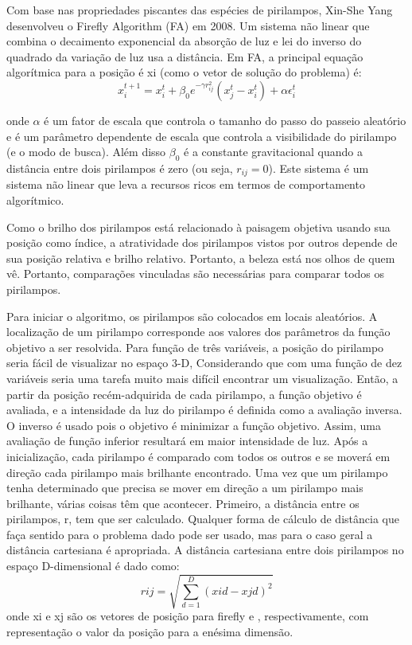 \documentclass[10pt]{article}
\begin{document}
Com base nas propriedades piscantes das espécies de 
pirilampos, Xin-She Yang desenvolveu o 
Firefly Algorithm (FA) em 2008. Um sistema não linear que 
combina o decaimento exponencial da absorção de luz e lei do 
inverso do quadrado da variação de luz usa a distância. 
Em FA, a principal equação algorítmica para a posição é xi 
(como o vetor de solução do problema) é:
\begin{equation}
  x_i^{t+1} = x_i^t + \beta_0e^{-\gamma r^2_{ij}}(x_j^t - x_i^t) + \alpha \epsilon_i^t
\end{equation}

onde \(\alpha\) é um fator de escala que controla o tamanho 
do passo do passeio aleatório e \gamma é um parâmetro 
dependente de escala que controla a visibilidade do pirilampo
(e o modo de busca). Além disso \(\beta_0\) é a constante 
gravitacional quando a distância entre dois pirilampos é zero
(ou seja, \(r_{ij} = 0\)). Este sistema é um sistema não 
linear que leva a recursos ricos em termos de comportamento 
algorítmico.

Como o brilho dos pirilampos está relacionado à paisagem 
objetiva usando sua posição como índice, a atratividade dos 
pirilampos vistos por outros depende de sua posição relativa
e brilho relativo. Portanto, a beleza está nos olhos de quem vê.
Portanto, comparações vinculadas são necessárias para 
comparar todos os pirilampos.


Para iniciar o algoritmo, os pirilampos são colocados em locais aleatórios. A localização de um pirilampo
corresponde aos valores dos parâmetros da função objetivo a ser resolvida. Para
função de três variáveis, a posição do pirilampo seria fácil de visualizar no espaço 3-D,
Considerando que com uma função de dez variáveis seria uma tarefa muito mais difícil encontrar um
visualização. Então, a partir da posição recém-adquirida de cada pirilampo, a função objetivo é
avaliada, e a intensidade da luz do pirilampo é definida como a avaliação inversa. O inverso é usado
pois o objetivo é minimizar a função objetivo. Assim, uma avaliação de função inferior resultará
em maior intensidade de luz. 
Após a inicialização, cada pirilampo é comparado com todos os outros e se moverá em direção
cada pirilampo mais brilhante encontrado. Uma vez que um pirilampo tenha determinado que precisa se mover em direção a um
pirilampo mais brilhante, várias coisas têm que acontecer. Primeiro, a distância entre os pirilampos, r, tem que
ser calculado. Qualquer forma de cálculo de distância que faça sentido para o problema dado pode ser
usado, mas para o caso geral a distância cartesiana é apropriada. A distância cartesiana
entre dois pirilampos no espaço D-dimensional é dado como:
\begin{equation}
  rij = \sqrt{\sum_{d=1}^{D} (xid -xjd)^2}
\end{equation}
onde xi e xj são os vetores de posição para firefly e , respectivamente, com representação
o valor da posição para a enésima dimensão.
    
\end{document}
